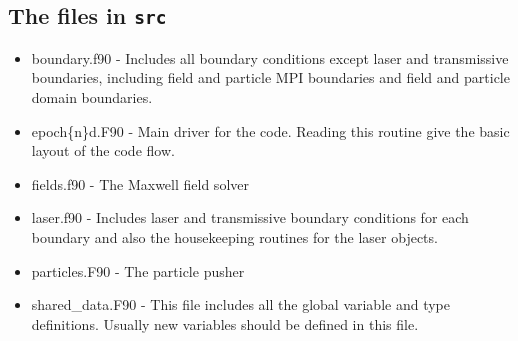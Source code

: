 \documentclass[12pt,a4paper]{article}
\newcommand{\inlinecode}[1]{{\color{warwickred} \bf\texttt{#1}}}
\begin{document}
\subsection{The files in \inlinecode{src}}
\begin{itemize}
\item boundary.f90 - Includes all boundary conditions except laser and
  transmissive boundaries, including field and particle MPI boundaries and
  field and particle domain boundaries.
\item epoch\{n\}d.F90 - Main driver for the code. Reading this routine give
  the basic layout of the code flow.
\item fields.f90 - The Maxwell field solver
\item laser.f90 - Includes laser and transmissive boundary conditions for each
  boundary and also the housekeeping routines for the laser objects.
\item particles.F90 - The particle pusher
\item shared\_data.F90 - This file includes all the global variable and type
  definitions. Usually new variables should be defined in this file.
\end{itemize}
\end{document}
